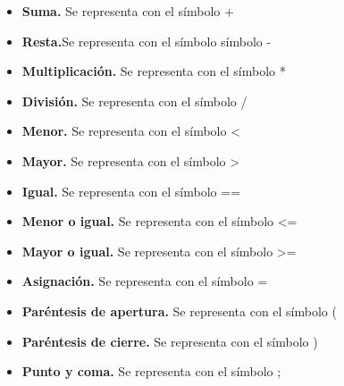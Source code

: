 \begin{itemize}
    \item \textbf{Suma.} Se representa con el símbolo +
    \item \textbf{Resta.}Se representa con el símbolo símbolo -
    \item \textbf{Multiplicación.} Se representa con el símbolo *
    \item \textbf{División.} Se representa con el símbolo /
    \item \textbf{Menor.} Se representa con el símbolo <
    \item \textbf{Mayor.} Se representa con el símbolo >
    \item \textbf{Igual.} Se representa con el símbolo ==
    \item \textbf{Menor o igual.} Se representa con el símbolo <=
    \item \textbf{Mayor o igual.} Se representa con el símbolo >=
    \item \textbf{Asignación.} Se representa con el símbolo = 
    \item \textbf{Paréntesis de apertura.} Se representa con el símbolo (
    \item \textbf{Paréntesis de cierre.} Se representa con el símbolo )
    \item \textbf{Punto y coma.} Se representa con el símbolo ;
\end{itemize}
